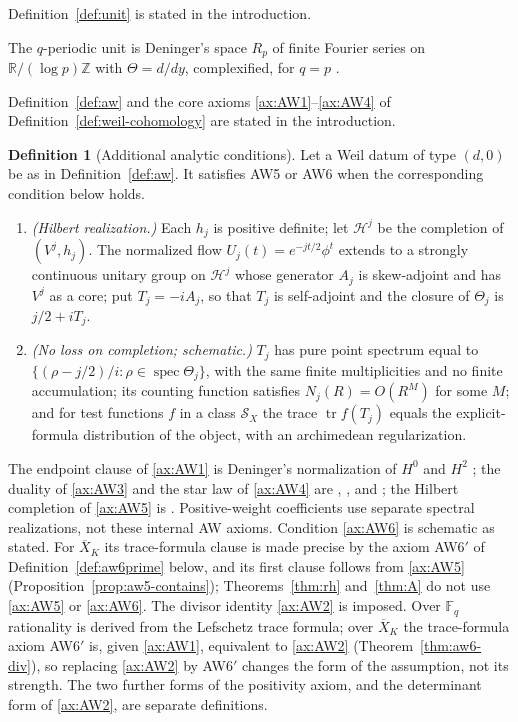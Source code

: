 \documentclass[11pt]{amsart}
\theoremstyle{plain}
\theoremstyle{definition}
\newtheorem{definition}[theorem]{Definition}
\theoremstyle{remark}
\numberwithin{equation}{section}
\newcommand{\R}{\mathbb{R}}
\newcommand{\Z}{\mathbb{Z}}
\newcommand{\F}{\mathbb{F}}
\newcommand{\Xbar}{\overline{X}}
\newcommand{\cH}{\mathscr{H}}
\DeclareMathOperator{\tr}{tr}
\DeclareMathOperator{\spec}{spec}
\begin{document}
Definition~\ref{def:unit} is stated in the introduction.


The $q$-periodic unit is Deninger's space $R_p$ of finite Fourier series
on $\R/(\log p)\Z$ with $\Theta=d/dy$, complexified, for $q=p$
\cite[pp.~167--168 and Proposition~3.1]{Deninger1998Analogies}.

Definition~\ref{def:aw} and the core axioms
\ref{ax:AW1}--\ref{ax:AW4} of
Definition~\ref{def:weil-cohomology} are stated in the introduction.

\begin{definition}[Additional analytic conditions]
\label{def:aw-analytic}
Let a Weil datum of type $(d,0)$ be as in Definition~\ref{def:aw}.
It satisfies AW5 or AW6 when the corresponding condition below holds.
\begin{enumerate}[label=\textbf{AW\arabic*},ref=AW\arabic*,
  leftmargin=*,start=5]
\item\label{ax:AW5} \emph{(Hilbert realization.)} Each $h_j$ is
  positive definite; let $\cH^j$ be the completion of $(V^j,h_j)$. The
  normalized flow
  $U_j(t)=e^{-jt/2}\phi^t$ extends to a strongly continuous unitary
  group on $\cH^j$ whose generator $A_j$ is skew-adjoint and has $V^j$
  as a core; put $T_j=-iA_j$, so that $T_j$ is self-adjoint and the
  closure of $\Theta_j$ is $j/2+iT_j$.
\item\label{ax:AW6} \emph{(No loss on completion; schematic.)} $T_j$
  has pure point spectrum equal to
  $\{(\rho-j/2)/i:\rho\in\spec\Theta_j\}$, with the same finite
  multiplicities and no finite accumulation; its counting function
  satisfies $N_j(R)=O(R^M)$ for some $M$; and for test functions $f$ in
  a class $\mathcal S_X$ the trace $\tr f(T_j)$ equals the
  explicit-formula distribution of the object, with an archimedean
  regularization.
\end{enumerate}
\end{definition}


The endpoint clause of \ref{ax:AW1} is Deninger's normalization of
$H^0$ and $H^2$ \cite[(3), p.~168]{Deninger1998Analogies}; the duality
of \ref{ax:AW3} and the star law of \ref{ax:AW4} are
\cite[pp.~168--169 and p.~172]{Deninger1998Analogies},
\cite[pp.~4--5]{Deninger2010HilbertPolya}, and
\cite[Conjecture~2.3(iii)--(iv), p.~522]%
{FlachMorin2020DeningerWeilArakelov}; the Hilbert completion of
\ref{ax:AW5} is \cite[p.~33]{Deninger1994Motivic}.
Positive-weight coefficients use separate spectral realizations, not
these internal AW axioms. Condition \ref{ax:AW6} is schematic as
stated. For $\Xbar_K$ its trace-formula clause is made precise by the
axiom AW6$'$ of Definition~\ref{def:aw6prime} below, and its first
clause follows from \ref{ax:AW5}
(Proposition~\ref{prop:aw5-contains}); Theorems~\ref{thm:rh}
and~\ref{thm:A} do not use \ref{ax:AW5} or \ref{ax:AW6}. The divisor
identity \ref{ax:AW2} is
imposed. Over $\F_q$ rationality is derived from the Lefschetz trace
formula; over $\Xbar_K$ the trace-formula axiom AW6$'$ is, given
\ref{ax:AW1}, equivalent to \ref{ax:AW2}
(Theorem~\ref{thm:aw6-div}), so replacing \ref{ax:AW2} by
AW6$'$ changes the form of the assumption, not its strength.
 The two further forms of the positivity axiom, and the
determinant form of \ref{ax:AW2}, are separate definitions.
\end{document}
